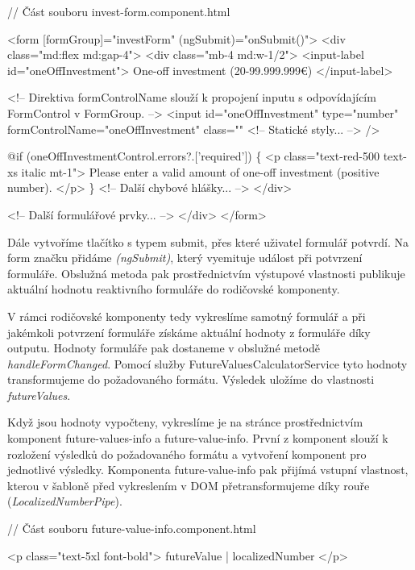 \begin{prog}
// Část souboru invest-form.component.html

<form [formGroup]="investForm" (ngSubmit)="onSubmit()">
  <div class="md:flex md:gap-4">
    <div class="mb-4 md:w-1/2">
      <input-label id="oneOffInvestment">
        One-off investment (20-99.999.999€)
      </input-label>

      <!-- Direktiva formControlName slouží k propojení inputu 
        s odpovídajícím FormControl v FormGroup. -->
      <input
        id="oneOffInvestment"
        type="number"
        formControlName="oneOffInvestment"
        class="" <!-- Statické styly... -->
      />

      @if (oneOffInvestmentControl.errors?.['required']) \{
        <p class="text-red-500 text-xs italic mt-1">
          Please enter a valid amount of one-off investment (positive number).
        </p>
      \}
      <!-- Další chybové hlášky... -->
    </div>

    <!-- Další formulářové prvky... -->
  </div>
</form>
\end{prog}

Dále vytvoříme tlačítko s typem submit, přes které uživatel formulář potvrdí. Na form značku přidáme \emph{(ngSubmit)}, který vyemituje událost při potvrzení formuláře. 
Obslužná metoda pak prostřednictvím výstupové vlastnosti publikuje aktuální hodnotu reaktivního formuláře do rodičovské komponenty.

V rámci rodičovské komponenty tedy vykreslíme samotný formulář a při jakémkoli potvrzení formuláře získáme aktuální hodnoty z formuláře díky outputu. 
Hodnoty formuláře pak dostaneme v obslužné metodě \emph{handleFormChanged}. Pomocí služby FutureValuesCalculatorService tyto hodnoty transformujeme do požadovaného formátu. 
Výsledek uložíme do vlastnosti \emph{futureValues}.

Když jsou hodnoty vypočteny, vykreslíme je na stránce prostřednictvím komponent future-values-info a future-value-info. 
První z komponent slouží k rozložení výsledků do požadovaného formátu a vytvoření komponent pro jednotlivé výsledky. 
Komponenta future-value-info pak přijímá vstupní vlastnost, kterou v šabloně před vykreslením v DOM přetransformujeme díky rouře (\emph{LocalizedNumberPipe}).

\begin{prog}
// Část souboru future-value-info.component.html

<p class="text-5xl font-bold">{{ futureValue | localizedNumber }}</p>
\end{prog}


